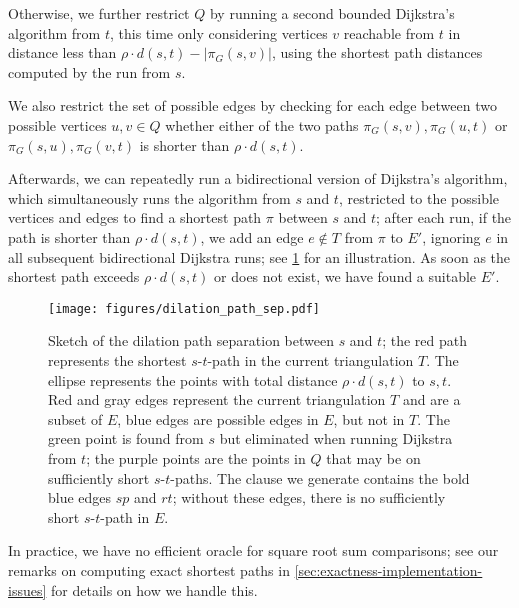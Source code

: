 Otherwise, we further restrict $Q$ by running a second bounded Dijkstra's algorithm from $t$,
this time only considering vertices $v$ reachable from $t$ in distance less than $\rho \cdot d(s,t) - |\pi_G(s,v)|$,
using the shortest path distances computed by the run from $s$.

We also restrict the set of possible edges by checking for each edge between two possible vertices $u, v \in Q$ 
whether either of the two paths $\pi_G(s,v),\pi_G(u,t)$ or $\pi_G(s,u),\pi_G(v,t)$ is shorter than $\rho \cdot d(s,t)$.

Afterwards, we can repeatedly run a bidirectional version of Dijkstra's algorithm,
which simultaneously runs the algorithm from $s$ and $t$, restricted to the possible vertices and edges to find a shortest path $\pi$ between $s$ and $t$;
after each run, if the path is shorter than $\rho \cdot d(s,t)$, we add an edge $e \notin T$ from $\pi$ to $E'$,
ignoring $e$ in all subsequent bidirectional Dijkstra runs; see \cref{fig:path-enumeration} for an illustration.
As soon as the shortest path exceeds $\rho \cdot d(s,t)$ or does not exist, we have found a suitable $E'$.

\begin{figure}
    \centering
    \texttt{[image: figures/dilation\_path\_sep.pdf]}
    \caption{Sketch of the dilation path separation between $s$ and $t$;
             the red path represents the shortest $s$-$t$-path in the current triangulation $T$.
             The ellipse represents the points with total distance $\rho \cdot d(s,t)$ to $s,t$.
             Red and gray edges represent the current triangulation $T$ and are a subset of $E$,
             blue edges are possible edges in $E$, but not in $T$.
             The green point is found from $s$ but eliminated when running Dijkstra from $t$;
             the purple points are the points in $Q$ that may be on sufficiently short $s$-$t$-paths.
             The clause we generate contains the bold blue edges $sp$ and $rt$; 
             without these edges, there is no sufficiently short $s$-$t$-path in $E$.}
    \label{fig:path-enumeration}
\end{figure}

In practice, we have no efficient oracle for square root sum comparisons;
see our remarks on computing exact shortest paths in \cref{sec:exactness-implementation-issues} for details on how we handle this.


